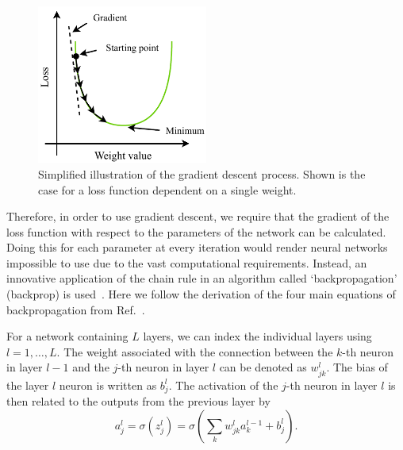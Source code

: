 \begin{figure} %
    \includegraphics[width=0.5\textwidth]{diagrams/6-cvn/gradient_descent.pdf}
    \caption[Illustration of the gradient descent process.]
    {Simplified illustration of the gradient descent process. Shown is the case for a loss
        function dependent on a single weight.}
    \label{fig:gradient_descent}
\end{figure}

Therefore, in order to use gradient descent, we require that the gradient of the loss function
with respect to the parameters of the network can be calculated. Doing this for each parameter at
every iteration would render neural networks impossible to use due to the vast computational
requirements. Instead, an innovative application of the chain rule in an algorithm called
`backpropagation' (backprop) is used~\cite{werbos1974}. Here we follow the derivation of the four
main equations of backpropagation from Ref.~\cite{mehta2019}.

For a network containing $L$ layers, we can index the individual layers using $l=1,\dots,L$. The
weight associated with the connection between the $k$-th neuron in layer $l-1$ and the $j$-th
neuron in layer $l$ can be denoted as $w^{l}_{jk}$. The bias of the layer $l$ neuron is written as
$b^{l}_{j}$. The activation of the $j$-th neuron in layer $l$ is then related to the outputs from
the previous layer by
\begin{equation} %
    a^{l}_{j}=\sigma(z^{l}_{j})=\sigma\left(\sum_{k}w^{l}_{jk}a^{l-1}_{k}+b^{l}_{j}\right).
    \label{eq:feedforward}
\end{equation}

